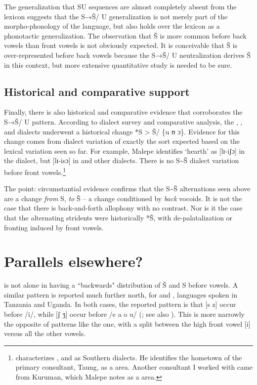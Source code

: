 \documentclass[output=paper,newtxmath,modfonts,nonflat]{langsci/langscibook}
\begin{document}
The generalization that SU sequences are almost completely absent from the lexicon suggests that the S→Š/ {\longrule} U generalization is not merely part of the morpho-phonology of the language, but also holds over the lexicon as a phonotactic generalization. The observation that Š is more common before back vowels than front vowels is not obviously expected. It is conceivable that Š is over-represented before back vowels because the S→Š/ {\longrule} U neutralization derives Š in this context, but more extensive quantitative study is needed to be sure.

\subsection{Historical and comparative support}\label{sec:bennett:2.6}

Finally, there is also historical and comparative evidence that corroborates the S→Š/ {\longrule} U pattern. According to  dialect survey and comparative analysis, the , , and  dialects underwent a historical change *S > Š/ {\longrule} \{u ʊ ɔ\}. Evidence for this change comes from dialect variation of exactly the sort expected based on the lexical variation seen so far. For example, Malepe identifies ‘hearth’ as [lɪ-iʃɔ] in the  dialect, but [lɪ-isɔ] in  and other dialects. There is no S{\textasciitilde}Š dialect variation before front vowels.\footnote{\citet{Malepe1966} characterizes ,  and  as Southern dialects. He identifies the hometown of the primary consultant, Taung, as a  area. Another consultant I worked with came from Kuruman, which Malepe notes as a  area.}

The point: circumstantial evidence confirms that the S{\textasciitilde}Š alternations seen above are a change \textit{from} S, \textit{to} Š – a change conditioned by \textit{back} vocoids. It is not the case that there is back-and-forth allophony with no contrast. Nor is it the case that the alternating stridents were historically *Š, with de-palatalization or fronting induced by front vowels. 

\section{Parallels elsewhere?}\label{sec:bennett:3}

 is not alone in having a ``backwards" distribution of Š and S before vowels. A similar pattern is reported much further north, for  and ,  languages spoken in Tanzania and Uganda. In both cases, the reported pattern is that [s z] occur before /i/, while [ʃ ʒ] occur before /e a o u/ \linebreak (\citealt{Byarushengo1975,Hyman2003b}; see also \citealt{Hansson2001,Hansson2010}). This is more narrowly the opposite of patterns like the  one, with a split between the high front vowel [i] versus all the other vowels.
\end{document}
